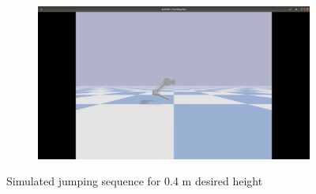 \documentclass[onecolumn, letter paper]{report}
\begin{document}
\begin{figure}[htb!]
\begin{subfigure}{.24\textwidth}
    \end{subfigure}
    \begin{subfigure}{.24\textwidth}
    \includegraphics[width=\textwidth, trim={25cm 10cm 25cm 5cm}, clip]{figures/sim0.4m/s44.png}
    \end{subfigure}
    \caption{Simulated jumping sequence for 0.4 m desired height}
    \label{fig:simsequence4}
\end{figure}
\end{document}
